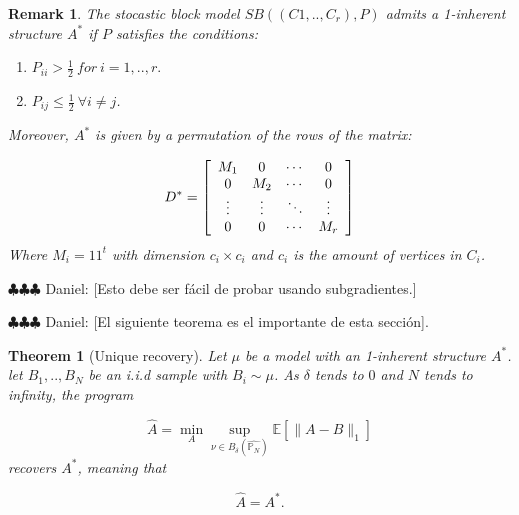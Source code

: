 \documentclass[12pt]{amsart}
\newtheorem{theorem}[lemma]{Theorem}
\newtheorem{remark}[lemma]{Remark}
\numberwithin{equation}{section}
\newcommand{\EE}{\mathbb{E}}
\newcommand{\ddr}[1]{{\color{blue} \sf $\clubsuit\clubsuit\clubsuit$ Daniel: [#1]}}
\begin{document}
\begin{remark}
The stocastic block model 
$SB((C1,..,C_r),P)$ admits a 1-inherent structure $A^*$ if $P$ satisfies the conditions:
\begin{enumerate}
\item $P_{ii}>\frac{1}{2} \ for \ i=1,..,r.$
\item $P_{ij} \leq \frac{1}{2} \  \forall  i \neq j$.
\end{enumerate}
Moreover, $A^*$ is given by a permutation of the rows of the matrix:

\[
D^* = 
\left[
\begin{array}{c c c c}
M_1 & 0 &\cdots & 0\\
0 & M_2 & \cdots & 0 \\ 
\vdots & \vdots & \ddots & \vdots \\
0 & 0& \cdots & M_r

\end{array}
\right] 
\]
Where  $M_i=11^t$ with dimension $c_i \times c_i$ and $c_i$ is the amount of vertices in $C_i$.
\end{remark}


\ddr{Esto debe ser f\'acil de probar usando subgradientes.}

\ddr{El siguiente teorema es el importante de esta secci\'on}.

\begin{theorem}[Unique recovery]
Let $\mu$ be a model with an 1-inherent structure $A^*$. let $B_1,..,B_N$ be an i.i.d sample with $B_i \sim \mu$.
As $\delta$ tends to $0$ and $N$ tends to infinity, the program 

\[
\hat{A}=\min_A\sup_{\nu\in B_{\delta}(\hat{\mathbb{P}_N})} \EE[\|A-B\|_1]
\]
recovers $A^*$, meaning that

\[
\hat{A}=A^*.
\]


\end{theorem}
\end{document}
